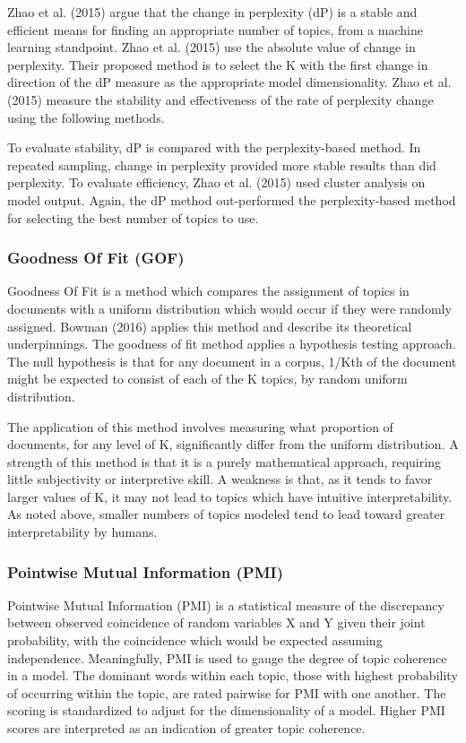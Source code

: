 \documentclass[conference]{IEEEtran}
\begin{document}
Zhao et al. (2015) argue that the change in perplexity (dP) is a stable and efficient means for finding an appropriate number of topics, from a machine learning standpoint. Zhao et al. (2015) use the absolute value of change in perplexity. Their proposed method is to select the K with the first change in direction of the dP measure as the appropriate model dimensionality. Zhao et al. (2015) measure the stability and effectiveness of the rate of perplexity change using the following methods.

To evaluate stability, dP is compared with the perplexity-based method. In repeated sampling, change in perplexity provided more stable results than did perplexity. To evaluate efficiency, Zhao et al. (2015) used cluster analysis on model output. Again, the dP method out-performed the perplexity-based method for selecting the best number of topics to use.

\subsubsection{Goodness Of Fit (GOF)}

Goodness Of Fit is a method which compares the assignment of topics in documents with a uniform distribution which would occur if they were randomly assigned. Bowman (2016) applies this method and describe its theoretical underpinnings. The goodness of fit method applies a hypothesis testing approach. The null hypothesis is that for any document in a corpus, 1/Kth of the document might be expected to consist of each of the K topics, by random uniform distribution.

The application of this method involves measuring what proportion of documents, for any level of K, significantly differ from the uniform distribution. A strength of this method is that it is a purely mathematical approach, requiring little subjectivity or interpretive skill. A weakness is that, as it tends to favor larger values of K, it may not lead to topics which have intuitive interpretability. As noted above, smaller numbers of topics modeled tend to lead toward greater interpretability by humans.

\subsubsection{Pointwise Mutual Information (PMI)}
Pointwise Mutual Information (PMI) is a statistical measure of the discrepancy between observed coincidence of random variables X and Y given their joint probability, with the coincidence which would be expected assuming independence.
Meaningfully, PMI is used to gauge the degree of topic coherence in a model. The dominant words within each topic, those with highest probability of occurring within the topic, are rated pairwise for PMI with one another. The scoring is standardized to adjust for the dimensionality of a model. Higher PMI scores are interpreted as an indication of greater topic coherence.
\end{document}
